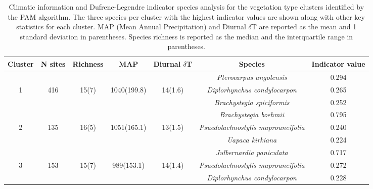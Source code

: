 \begin{table}[H]
\centering
\begin{tabular}{ccccccc}
  \hline
Cluster & N sites & Richness & MAP & Diurnal $\delta$T & Species & Indicator value \\ 
  \hline
 &  &  &  &  & \textit{Pterocarpus angolensis} & 0.294 \\ 
  1 & 416 & 15(7) & 1040(199.8) & 14(1.6) & \textit{Diplorhynchus condylocarpon} & 0.265 \\ 
   &  &  &  &  & \textit{Brachystegia spiciformis} & 0.252 \\ 
   \hline
 &  &  &  &  & \textit{Brachystegia boehmii} & 0.795 \\ 
  2 & 135 & 16(5) & 1051(165.1) & 13(1.5) & \textit{Psuedolachnostylis maprouneifolia} & 0.240 \\ 
   &  &  &  &  & \textit{Uapaca kirkiana} & 0.224 \\ 
   \hline
 &  &  &  &  & \textit{Julbernardia paniculata} & 0.717 \\ 
  3 & 153 & 15(7) & 989(153.1) & 14(1.4) & \textit{Psuedolachnostylis maprouneifolia} & 0.272 \\ 
   &  &  &  &  & \textit{Diplorhynchus condylocarpon} & 0.228 \\ 
  \end{tabular}
\caption{Climatic information and Dufrene-Legendre indicator species analysis for the vegetation type clusters identified by the PAM algorithm. The three species per cluster with the highest indicator values are shown along with other key statistics for each cluster. MAP (Mean Annual Precipitation) and Diurnal $\delta$T are reported as the mean and 1 standard deviation in parentheses. Species richness is reported as the median and the interquartile range in parentheses.} 
\label{clust_summ}
\end{table}

